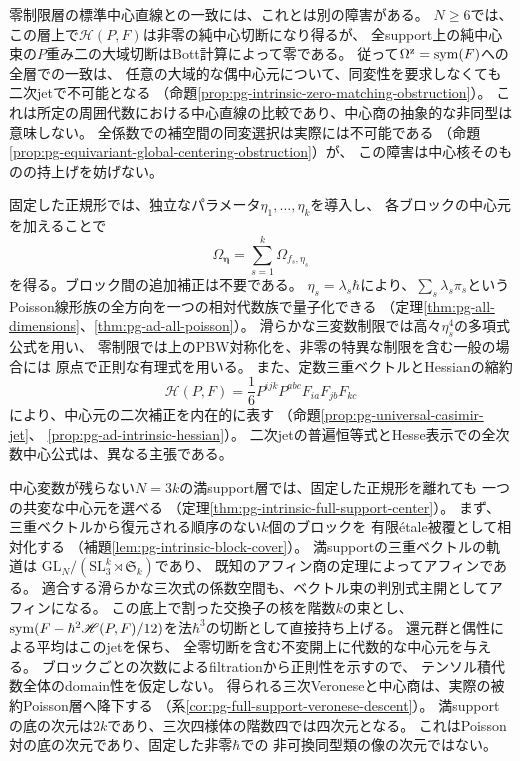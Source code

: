 零制限層の標準中心直線との一致には、これとは別の障害がある。
$N\ge6$では、この層上で$\mathscr H(P,F)$は非零の純中心切断になり得るが、
全support上の純中心束の$P$重み二の大域切断はBott計算によって零である。
従って$\Omega^{\mathrm z}=\operatorname{sym}(F)$への全層での一致は、
任意の大域的な偶中心元について、同変性を要求しなくても二次jetで不可能となる
（命題\ref{prop:pg-intrinsic-zero-matching-obstruction}）。
これは所定の周囲代数における中心直線の比較であり、中心商の抽象的な非同型は意味しない。
全係数での補空間の同変選択は実際には不可能である
（命題\ref{prop:pg-equivariant-global-centering-obstruction}）が、
この障害は中心核そのものの持上げを妨げない。

固定した正規形では、独立なパラメータ$\eta_1,\ldots,\eta_k$を導入し、
各ブロックの中心元を加えることで
\begin{equation}\label{eq:intro-independent-center}
 \Omega_{\boldsymbol\eta}=\sum_{s=1}^k\Omega_{f_s,\eta_s}
\end{equation}
を得る。ブロック間の追加補正は不要である。
$\eta_s=\lambda_s\hbar$により、$\sum_s\lambda_s\pi_s$という
Poisson線形族の全方向を一つの相対代数族で量子化できる
（定理\ref{thm:pg-all-dimensions}、\ref{thm:pg-ad-all-poisson}）。
滑らかな三変数制限では高々$\eta_s^4$の多項式公式を用い、
零制限では上のPBW対称化を、非零の特異な制限を含む一般の場合には
原点で正則な有理式を用いる。
また、定数三重ベクトルとHessianの縮約
\begin{equation}\label{eq:intro-intrinsic-hessian}
 \mathscr H(P,F)=\frac16P^{ijk}P^{abc}F_{ia}F_{jb}F_{kc}
\end{equation}
により、中心元の二次補正を内在的に表す
（命題\ref{prop:pg-universal-casimir-jet}、
\ref{prop:pg-ad-intrinsic-hessian}）。
二次jetの普遍恒等式とHesse表示での全次数中心公式は、異なる主張である。

中心変数が残らない$N=3k$の満support層では、固定した正規形を離れても
一つの共変な中心元を選べる
（定理\ref{thm:pg-intrinsic-full-support-center}）。
まず、三重ベクトルから復元される順序のない$k$個のブロックを
有限\'etale被覆として相対化する
（補題\ref{lem:pg-intrinsic-block-cover}）。
満supportの三重ベクトルの軌道は
$\mathrm{GL}_N/(\mathrm{SL}_3^k\rtimes\mathfrak S_k)$であり、
既知のアフィン商の定理によってアフィンである。
適合する滑らかな三次式の係数空間も、ベクトル束の判別式主開としてアフィンになる。
この底上で割った交換子の核を階数$k$の束とし、
$\operatorname{sym}(F-\hbar^2\mathscr H(P,F)/12)$を法$\hbar^3$の切断として直接持ち上げる。
還元群と偶性による平均はこのjetを保ち、
全零切断を含む不変開上に代数的な中心元を与える。
ブロックごとの次数によるfiltrationから正則性を示すので、
テンソル積代数全体のdomain性を仮定しない。
得られる三次Veroneseと中心商は、実際の被約Poisson層へ降下する
（系\ref{cor:pg-full-support-veronese-descent}）。
満supportの底の次元は$2k$であり、三次四様体の階数四では四次元となる。
これはPoisson対の底の次元であり、固定した非零$\hbar$での
非可換同型類の像の次元ではない。

